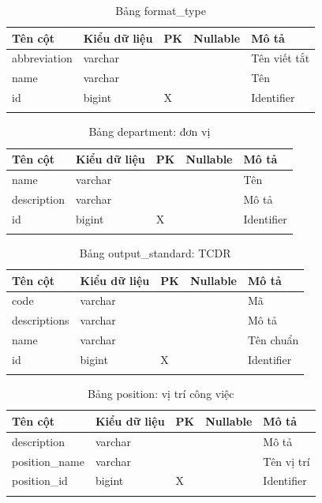 \documentclass[report.tex]{subfiles}
\begin{document}
\begin{table}[!htb]
\begin{longtable}{|p{3cm}|p{3cm}|p{1cm}|p{1.6cm}|p{6cm}|}
\hline
\textbf{Tên cột} & \textbf{Kiểu dữ liệu} & \textbf{PK} & \textbf{Nullable} & \textbf{Mô tả} \\
\hline
abbreviation & varchar & & & Tên viết tắt \\
name & varchar & & & Tên \\
id & bigint & X & & Identifier \\
\hline
\caption[Bảng format\_type]{Bảng format\_type}
\end{longtable}
\end{table}
\FloatBarrier


\begin{table}[!htb]
\begin{longtable}{|p{3cm}|p{3cm}|p{1cm}|p{1.6cm}|p{6cm}|}
\hline
\textbf{Tên cột} & \textbf{Kiểu dữ liệu} & \textbf{PK} & \textbf{Nullable} & \textbf{Mô tả} \\
\hline
name & varchar & & & Tên \\
description & varchar & & & Mô tả \\
id & bigint & X & & Identifier \\
\hline
\caption[Bảng department]{Bảng department: đơn vị}
\end{longtable}
\end{table}
\FloatBarrier


\begin{table}[!htb]
\begin{longtable}{|p{3cm}|p{3cm}|p{1cm}|p{1.6cm}|p{6cm}|}
\hline
\textbf{Tên cột} & \textbf{Kiểu dữ liệu} & \textbf{PK} & \textbf{Nullable} & \textbf{Mô tả} \\
\hline
code & varchar & & & Mã \\
descriptions & varchar & & & Mô tả \\
name & varchar & & & Tên chuẩn \\
id & bigint & X & & Identifier \\
\hline
\caption[Bảng output\_standard]{Bảng output\_standard: TCDR}
\end{longtable}
\end{table}
\FloatBarrier

\begin{table}[!htb]
\begin{longtable}{|p{3cm}|p{3cm}|p{1cm}|p{1.6cm}|p{6cm}|}
\hline
\textbf{Tên cột} & \textbf{Kiểu dữ liệu} & \textbf{PK} & \textbf{Nullable} & \textbf{Mô tả} \\
\hline
description & varchar & & & Mô tả \\
position\_name & varchar & & & Tên vị trí \\
position\_id & bigint & X & & Identifier \\
\hline
\caption[Bảng position]{Bảng position: vị trí công việc}
\end{longtable}
\end{table}
\FloatBarrier
\end{document}
